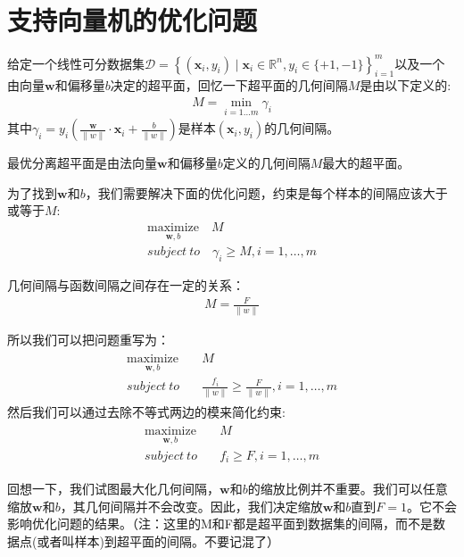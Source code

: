 \section{支持向量机的优化问题}

给定一个线性可分数据集$\mathcal{D}=\left\{(\mathbf{x}_i,y_i)\mid \mathbf{x}_i \in \mathbb{R}^n,y_i \in \{+1,-1\}  \right\}_{i=1}^m$以及一个由向量$\mathbf{w}$和偏移量$b$决定的超平面，回忆一下超平面的几何间隔$M$是由以下定义的:
\begin{gather*}
M = \min_{i=1\dots m}\gamma_i
\end{gather*}
其中$\gamma_i=y_i(\frac{\mathbf{w}}{\|w\|}\cdot \mathbf{x}_i + \frac{b}{\|w\|})$是样本$(\mathbf{x}_i,y_i)$的几何间隔。

最优分离超平面是由法向量$\mathbf{w}$和偏移量$b$定义的几何间隔$M$最大的超平面。

为了找到$\mathbf{w}$和$b$，我们需要解决下面的优化问题，约束是每个样本的间隔应该大于或等于$M$:
\begin{gather*}
\underset{\mathbf{w},b}{\text{maximize}} \quad M \\
subject\ to\quad \gamma_i \geq M,i=1,\dots,m
\end{gather*}

几何间隔与函数间隔之间存在一定的关系：
\begin{gather*}
M = \frac{F}{\|w\|}
\end{gather*}

所以我们可以把问题重写为：
\begin{gather*}
\begin{align*}
\underset{\mathbf{w},b}{\text{maximize}} \quad &M \\
subject\ to\quad &\frac{f_i}{\|w\|} \geq \frac{F}{\|w\|},i=1,\dots,m
\end{align*}
\end{gather*}
然后我们可以通过去除不等式两边的模来简化约束:
\begin{gather*}
\begin{align*}
\underset{\mathbf{w},b}{\text{maximize}} \quad &M \\
subject\ to\quad &f_i \geq F,i=1,\dots,m
\end{align*}
\end{gather*}

回想一下，我们试图最大化几何间隔，$\mathbf{w}$和$b$的缩放比例并不重要。我们可以任意缩放$\mathbf{w}$和$b$，其几何间隔并不会改变。因此，我们决定缩放$\mathbf{w}$和$b$直到$F=1$。它不会影响优化问题的结果。（注：这里的M和F都是超平面到数据集的间隔，而不是数据点(或者叫样本)到超平面的间隔。不要记混了）

